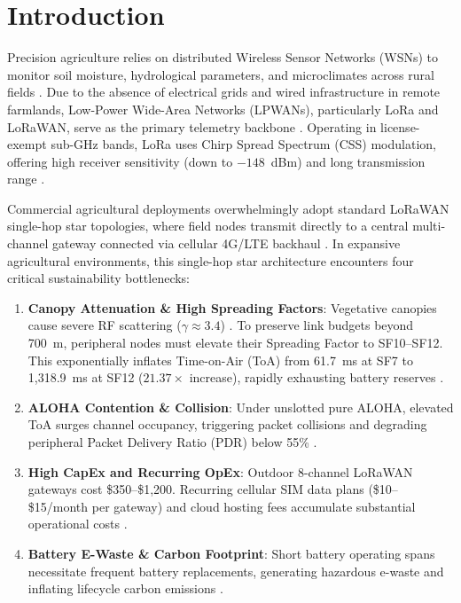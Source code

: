 \documentclass[conference]{IEEEtran}
\begin{document}
\section{Introduction}
\label{sec:introduction}
Precision agriculture relies on distributed Wireless Sensor Networks (WSNs) to monitor soil moisture, hydrological parameters, and microclimates across rural fields \cite{saiz2020smart, ullo2021advances}. Due to the absence of electrical grids and wired infrastructure in remote farmlands, Low-Power Wide-Area Networks (LPWANs), particularly LoRa and LoRaWAN, serve as the primary telemetry backbone \cite{saban2023smart, kim2020review}. Operating in license-exempt sub-GHz bands, LoRa uses Chirp Spread Spectrum (CSS) modulation, offering high receiver sensitivity (down to $-148$~dBm) and long transmission range \cite{adelantado2017lora, saravanos2022path}.

Commercial agricultural deployments overwhelmingly adopt standard LoRaWAN single-hop star topologies, where field nodes transmit directly to a central multi-channel gateway connected via cellular 4G/LTE backhaul \cite{patsakis2023lorawan, hossen2026iot}. In expansive agricultural environments, this single-hop star architecture encounters four critical sustainability bottlenecks:
\begin{enumerate}
    \item \textbf{Canopy Attenuation \& High Spreading Factors}: Vegetative canopies cause severe RF scattering ($\gamma \approx 3.4$) \cite{saravanos2022path}. To preserve link budgets beyond 700~m, peripheral nodes must elevate their Spreading Factor to SF10--SF12. This exponentially inflates Time-on-Air (ToA) from 61.7~ms at SF7 to 1,318.9~ms at SF12 ($21.37\times$ increase), rapidly exhausting battery reserves \cite{delgado2020energy}.
    \item \textbf{ALOHA Contention \& Collision}: Under unslotted pure ALOHA, elevated ToA surges channel occupancy, triggering packet collisions and degrading peripheral Packet Delivery Ratio (PDR) below 55\% \cite{adelantado2017lora, tang2026data}.
    \item \textbf{High CapEx and Recurring OpEx}: Outdoor 8-channel LoRaWAN gateways cost \$350--\$1,200. Recurring cellular SIM data plans (\$10--\$15/month per gateway) and cloud hosting fees accumulate substantial operational costs \cite{abdelli2025field, mascherpa2023smartwt}.
    \item \textbf{Battery E-Waste \& Carbon Footprint}: Short battery operating spans necessitate frequent battery replacements, generating hazardous e-waste and inflating lifecycle carbon emissions \cite{zhu2015green}.
\end{enumerate}
\end{document}
